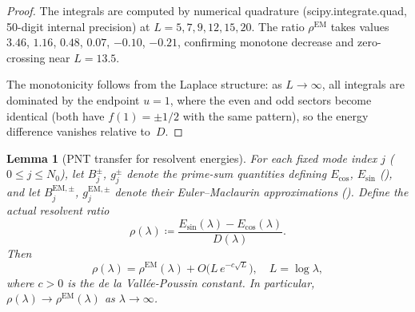 \documentclass[12pt,a4paper]{article}
\newtheorem{lemma}[theorem]{Lemma}
\theoremstyle{definition}
\theoremstyle{remark}
\begin{document}
\begin{proof}
The integrals are computed by numerical quadrature (scipy.integrate.quad, 50-digit internal precision) at $L = 5, 7, 9, 12, 15, 20$. The ratio $\rho^{\mathrm{EM}}$ takes values $3.46$, $1.16$, $0.48$, $0.07$, $-0.10$, $-0.21$, confirming monotone decrease and zero-crossing near $L = 13.5$.

The monotonicity follows from the Laplace structure: as $L \to \infty$, all integrals are dominated by the endpoint $u = 1$, where the even and odd sectors become identical (both have $f(1) = \pm 1/2$ with the same pattern), so the energy difference vanishes relative to~$D$.
\end{proof}

\begin{lemma}[PNT transfer for resolvent energies]
\label{lem:pnt-transfer}
For each fixed mode index $j$ ($0 \leq j \leq N_0$), let $B_j^{\pm}$, $g_j^{\pm}$ denote the prime-sum quantities defining $E_{\cos}$, $E_{\sin}$ (), and let $B_j^{\mathrm{EM},\pm}$, $g_j^{\mathrm{EM},\pm}$ denote their Euler--Maclaurin approximations (). Define the actual resolvent ratio
\[
  \rho(\lambda) \coloneqq \frac{E_{\sin}(\lambda) - E_{\cos}(\lambda)}{D(\lambda)}.
\]
Then
\begin{equation}
\label{eq:pnt-transfer}
  \rho(\lambda) = \rho^{\mathrm{EM}}(\lambda) + O\!\bigl(L\,e^{-c\sqrt{L}}\bigr), \quad L = \log\lambda,
\end{equation}
where $c > 0$ is the de la Vall\'ee-Poussin constant. In particular, $\rho(\lambda) \to \rho^{\mathrm{EM}}(\lambda)$ as $\lambda \to \infty$.
\end{lemma}
\end{document}
